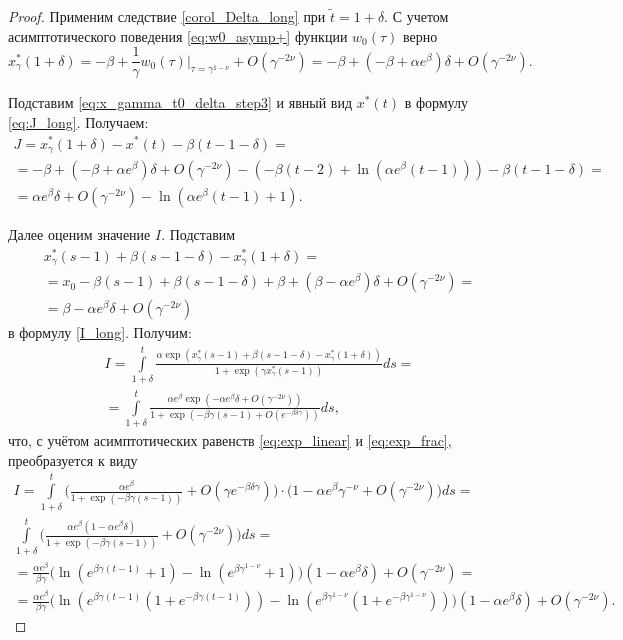 \begin{proof}
Применим следствие \ref{corol_Delta_long} при $\tilde{t} = 1 + \delta$. С учетом асимптотического поведения \eqref{eq:w0_asymp+} функции $w_0(\tau)$ верно
\begin{equation}
\label{eq:x_gamma_t0_delta_step3}
	x_\gamma^*(1 + \delta) = -\beta + \frac{1}{\gamma} w_0(\tau)|_{\tau=\gamma^{1 - \nu}} + O(\gamma^{-2\nu}) = -\beta + (-\beta + \alpha e^\beta)\delta + O(\gamma^{-2\nu}).
\end{equation}

Подставим \eqref{eq:x_gamma_t0_delta_step3} и явный вид $x^*(t)$ в формулу \eqref{eq:J_long}. Получаем:
\small
\begin{multline}
	\label{eq:J_step3}
	J = x_\gamma^*(1 + \delta) - x^*(t) - \beta(t - 1 - \delta) =\\
	= -\beta + (-\beta + \alpha e^\beta)\delta + O(\gamma^{-2\nu}) - 
	(-\beta(t - 2) + \ln(\alpha e^{\beta}(t - 1))) - \beta (t - 1 - \delta) = \\
	 =\alpha e^\beta\delta + O(\gamma^{-2\nu}) - \ln(\alpha e^{\beta}(t - 1) + 1).
\end{multline}
\normalsize

Далее оценим значение $I$. Подставим
%
\begin{multline*}
x^*_{\gamma}(s - 1) + \beta (s - 1 - \delta) - x^*_{\gamma} (1 + \delta) =\\
= x_0 - \beta(s - 1) + \beta(s - 1 - \delta) + \beta + (\beta - \alpha e^{\beta}) \delta + O(\gamma^{-2\nu}) =\\
= \beta - \alpha e^{\beta} \delta + O(\gamma^{-2\nu})
\end{multline*}
%
в формулу \eqref{I_long}. Получим:
\begin{multline*}
	I=\int\limits_{1+\delta}^{t}\frac{\alpha\exp(x_\gamma^*(s-1)+\beta(s-1-\delta)-x_\gamma^*(1+\delta))}{1+\exp(\gamma x_\gamma^*(s-1))} ds =\\
	=\int\limits_{1+\delta}^{t}\frac{\alpha e^{\beta}\exp(-\alpha e^\beta\delta+O(\gamma^{-2\nu}))}{1+\exp( -\beta\gamma (s-1)+O(e^{-\beta\delta\gamma}))} ds,
\end{multline*}
%
что, с учётом асимптотических равенств \eqref{eq:exp_linear} и \eqref{eq:exp_frac}, преобразуется к виду
\begin{multline*}
	I = \int\limits_{1 + \delta}^{t}\Big(\frac{\alpha e^\beta}{1 + \exp(-\beta\gamma(s-1))} + O(\gamma e^{-\beta\delta\gamma})\Big) \cdot \big(1-\alpha e^{\beta} \gamma^{-\nu} + O(\gamma^{-2\nu})\big)ds=\\
	\int\limits_{1+\delta}^{t}\Big(\frac{\alpha e^\beta(1-\alpha e^{\beta}\delta)}{1 + \exp(-\beta\gamma(s-1))} + O(\gamma^{-2\nu})\Big)ds=\\
	= \frac{\alpha e^{\beta}}{\beta\gamma}\big(\ln(e^{\beta\gamma(t - 1)} + 1) - \ln(e^{\beta\gamma^{1-\nu}}+1)\big)(1-\alpha e^{\beta}\delta)+O(\gamma^{-2\nu})=\\
	= \frac{\alpha e^{\beta}}{\beta\gamma}\big(\ln(e^{\beta\gamma(t-1)}(1 + e^{-\beta\gamma(t - 1)})) - \ln(e^{\beta\gamma^{1 - \nu}}(1 + e^{-\beta\gamma^{1-\nu}}))\big)(1-\alpha e^{\beta}\delta)+O(\gamma^{-2\nu}).
\end{multline*}
	

\end{proof}
